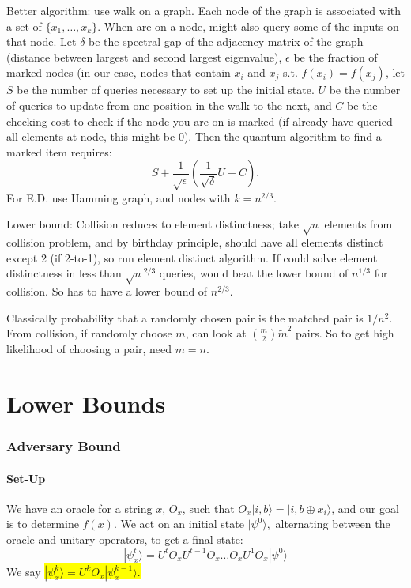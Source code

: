 \documentclass[12pt]{article}
\newcommand{\hilight}[1]{\colorbox{yellow}{#1}}
\begin{document}
Better algorithm: use walk on a graph. Each node of the graph is associated with a set of $\{x_1,\dots, x_k\}$.
When are on a node, might also query some of the inputs on that node.
 Let $\delta$ be the spectral gap of the adjacency matrix of the graph 
(distance between largest and second largest eigenvalue),
 $\epsilon$ be the fraction of marked nodes (in our case, nodes that contain $x_i$ and $x_j$ s.t. $f(x_i)=f(x_j)$,
 let $S$ be the number of queries necessary to set 
up the initial state. $U$ be the number of queries to update from one position in the walk to the 
next, and $C$ be the checking cost to check if the node you are on is marked (if already have queried
all elements at node, this might be 0). Then the quantum algorithm to find a marked item requires:
$$S+\dfrac{1}{\sqrt{\epsilon}}(\dfrac{1}{\sqrt{\delta}}U+C).$$ For E.D. use Hamming graph, and nodes
with $k=n^{2/3}$.

Lower bound: Collision reduces to element distinctness; take $\sqrt{n}$ elements from collision problem, 
and by birthday principle, should have all elements distinct except 2 (if 2-to-1), so run element distinct algorithm.
If could solve element distinctness in less than $\sqrt{n}^{2/3}$ queries, would beat the lower bound of $n^{1/3}$ for collision.
So has to have a lower bound of $n^{2/3}$.

Classically probability that a randomly chosen pair is the matched pair is $1/n^2$. From collision,  if randomly choose $m$, can look at $\binom{m}{2}\tilde m^2$ pairs. So to get high likelihood of choosing a pair, need
$m=n$.

\part{Lower Bounds}
\setcounter{section}{0}
\section{Adversary Bound}
\subsection{Set-Up}
We have an oracle for a string $x$, $O_x$, such that $O_x|i,b\rangle=|i,b\oplus x_i\rangle$, and our goal is to determine $f(x)$. 
We act on an initial state $|\psi^0\rangle,$ alternating between the oracle and unitary operators, to get a final state:
$$|\psi_x^t\rangle=U^tO_xU^{t-1}O_x\dots O_x U^1O_x|\psi^0\rangle$$
We say \hilight{$|\psi_x^{k}\rangle=U^{k}O_x|\psi_x^{k-1}\rangle$.} 
\end{document}

